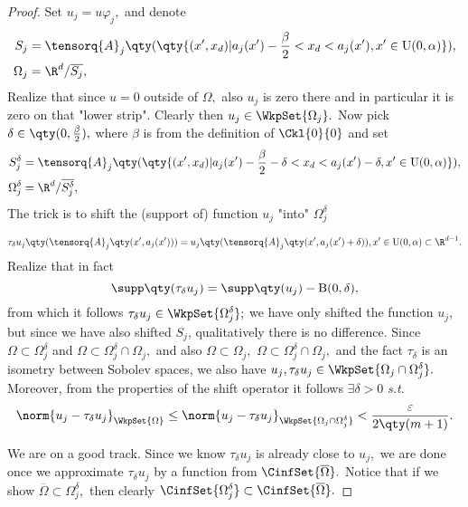 \begin{proof}
	Set $u_j = u \varphi_j,$ and denote
	\begin{align*}
		S_j &=\tensorq{A}_j\qty(\qty{(x',x_d) | a_j(x') - \frac{\beta}{2}  < x_d < a_j(x') , x' \in \text{U}(0,\alpha)}), \\
	\Omega_j &= \R^{d} / \overline{S_j},
	\end{align*}
	Realize that since $u = 0$ outside of $\Omega,$ also $u_j$ is zero there and in particular it is zero on that "lower strip". Clearly then $u_j \in \WkpSet{\Omega_j}.$ Now pick $\delta \in \qty(0,\frac{\beta}{2}),$ where $\beta$ is from the definition of $\Ckl{0}{0}$ and set
	\begin{align*}
	  		S_{j}^{\delta} &= \tensorq{A}_j\qty(\qty{(x',x_d) | a_j(x') - \frac{\beta}{2} - \delta < x_d < a_j(x') -\delta, x' \in \text{U}(0,\alpha)}), \\
		\Omega_j^{\delta} &= \R^{d} / \overline{S_{j}^{\delta}}, 
	\end{align*}
The trick is to shift the (support of) function $u_j$ "into" $\Omega_{j}^\delta$

	\[
		\tau_{\delta}u_j\qty(\tensorq{A}_j\qty(x', a_j(x'))) = u_j\qty(\tensorq{A}_j\qty(x', a_j(x') + \delta)), x' \in \text{U}(0,\alpha) \subset \R^{d-1}.
	\]
	Realize that in fact
	\[
		\supp\qty(\tau_{\delta}u_j) = \supp\qty(u_j) - \text{B}(0,\delta),
	\]
	from which it follows $\tau_{\delta}u_j \in \WkpSet{\Omega_j^{\delta}};$ we have only shifted the function $u_j$, but since we have also shifted $S_j$, qualitatively there is no difference. Since $\Omega \subset \Omega_j^\delta$ and $\Omega \subset \Omega_j^{\delta} \cap \Omega_j,$ and also $ \Omega \subset \Omega_j,$ $\Omega \subset \Omega_j^{\delta} \cap \Omega_j,$ and the fact $\tau_{\delta}$ is an isometry between Sobolev spaces, we also have $u_j, \tau_{\delta}u_j \in \WkpSet{\Omega_{j} \cap \Omega_j^{\delta}}.$ Moreover, from the properties of the shift operator it follows $\exists \delta >0$ \textit{s.t.}
	\[
		\norm{u_j - \tau_{\delta}u_j}_{\WkpSet{\Omega}}\leq \norm{u_j - \tau_{\delta}u_j}_{\WkpSet{\Omega_j \cap \Omega_j^{\delta}}} < \frac{\varepsilon}{2\qty(m+1)}.
	\]

	We are on a good track. Since we know $\tau_{\delta}u_j$ is already close to $u_j,$ we are done once we approximate $\tau_{\delta}u_j$ by a function from $\CinfSet{\overline{\Omega}}.$ Notice that if we show $\overline{\Omega} \subset \Omega_j^{\delta},$ then clearly $\CinfSet{\Omega_j^{\delta}} \subset \CinfSet{\overline{\Omega}}.$


\end{proof}
